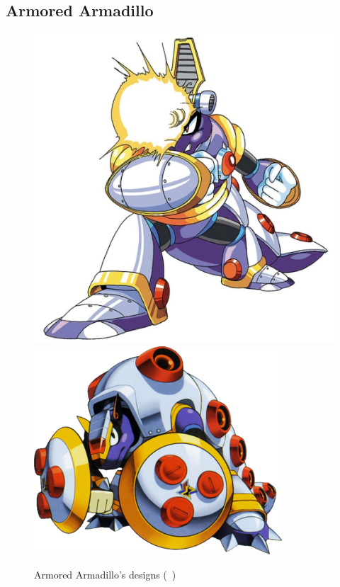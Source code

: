\subsection{Armored Armadillo}\label{boss:Armored_Armadillo}
\begin{figure}[htp]
	\centering
	\includegraphics[height=\portraitsize]{figures/X1/Armored_armadillo/Armored_armadillo.jpg}
	\includegraphics[height=\portraitsize]{figures/X1/Armored_armadillo/MHXArmoredArmadillo.png}
	\caption{Armored Armadillo's designs (~\cite{book:MMX_Complete_art})}
\end{figure}

